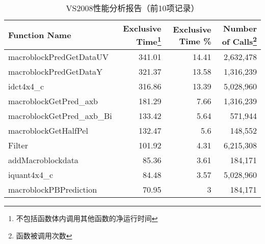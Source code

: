 \begin{table}[htbp]
  \centering
  \begin{minipage}[t]{\linewidth}
  \caption{VS2008性能分析报告（前10项记录）}
  \label{tab:vs10}
    \begin{tabular}{lrrr}
    \addlinespace
    \toprule[1.5pt]
    \textbf{Function Name} & \textbf{Exclusive Time\footnote{不包括函数体内调用其他函数的净运行时间}} & \textbf{Exclusive Time} \% & \textbf{Number of Calls\footnote{函数被调用次数}} \\
    \midrule[1pt]
    macroblockPredGetDataUV & 341.01 & 14.41 & 2,632,478 \\
    macroblockPredGetDataY & 321.37 & 13.58 & 1,316,239 \\
    idct4x4\_c & 316.86 & 13.39 & 5,028,960 \\
    macroblockGetPred\_axb & 181.29 & 7.66  & 1,316,239 \\
    macroblockGetPred\_axb\_Bi & 133.42 & 5.64  & 571,944 \\
    macroblockGetHalfPel & 132.47 & 5.6   & 148,552 \\
    Filter & 101.92 & 4.31  & 6,215,308 \\
    addMacroblockdata & 85.36 & 3.61  & 184,171 \\
    iquant4x4\_c & 84.48 & 3.57  & 5,028,960 \\
    macroblockPBPrediction & 70.95 & 3     & 184,171 \\
    \bottomrule[1.5pt]
    \end{tabular}
  \end{minipage}
\end{table}
